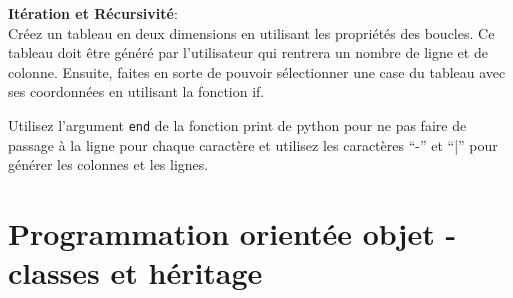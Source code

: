 \begin{Exercice}[15 minutes] \textbf{Itération et Récursivité}:\\
    Créez un tableau en deux dimensions en utilisant les propriétés des boucles. Ce tableau doit être généré par l’utilisateur qui rentrera un nombre de ligne et de colonne. 
    Ensuite, faites en sorte de pouvoir sélectionner une case du tableau avec ses coordonnées en utilisant la fonction if. 
    \begin{conseil}
        Utilisez l'argument \lstinline{end} de la fonction print de python pour ne pas faire de passage à la ligne pour chaque caractère et utilisez les caractères “-” et “|” pour générer les colonnes et les lignes.
    \end{conseil}

    \begin{solution}
        
    \end{solution}
\end{Exercice}

\section{Programmation orientée objet - classes et héritage}

